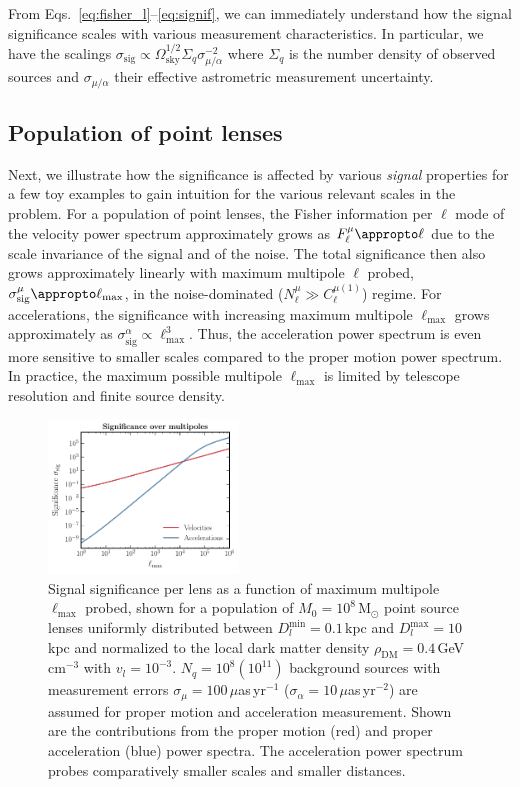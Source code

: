 \documentclass[prd,aps,twocolumn,nofootinbib,superscriptaddress,preprintnumbers,balancelastpage,longbibliography,floatfix]{revtex4-1}
\begin{document}
From Eqs.~\eqref{eq:fisher_l}--\eqref{eq:signif}, we can immediately understand how the signal significance scales with various measurement characteristics. In particular, we have the scalings $\sigma_\mathrm{sig}\propto \Omega_\mathrm{sky}^{1/2}\Sigma_q\sigma_{\mu/\alpha}^{-2}$ where  $\Sigma_q$ is the number density of observed sources and $\sigma_{\mu/\alpha}$ their effective astrometric measurement uncertainty. 

\subsection{Population of point lenses}

Next, we illustrate how the significance is affected by various \emph{signal} properties for a few toy examples to gain intuition for the various relevant scales in the problem.
For a population of point lenses, the Fisher information per $\ell$ mode of the velocity power spectrum approximately grows as $F_\ell^\mu \appropto \ell$ due to the scale invariance of the signal and of the noise. The total significance then also grows approximately linearly with maximum multipole $\ell$ probed, $\sigma_\mathrm{sig}^\mu \appropto \ell_\mathrm{max}$, in the noise-dominated ($N_\ell^\mu\gg C_{\ell}^{\mu (1)}$) regime. 
For accelerations, the significance with increasing maximum multipole $\ell_\mathrm{max}$ grows approximately as $\sigma_\mathrm{sig}^\alpha\propto\ell_\mathrm{max}^3$. Thus, the acceleration power spectrum is even more sensitive to smaller scales compared to the proper motion power spectrum. 
In practice, the maximum possible multipole $\ell_\mathrm{max}$ is limited by telescope resolution and finite source density.

\begin{figure}[htbp]
\centering
\includegraphics[width=0.45\textwidth]{plots/mualpha_compact.pdf}
\caption{Signal significance per lens as a function of maximum multipole $\ell_\mathrm{max}$ probed, shown for a population of $M_0=10^8$\,M$_\odot$ point source lenses uniformly distributed between $D_l^{\mathrm{min}}=0.1$\,kpc and $D_l^{\mathrm{max}}=10$\,kpc and normalized to the local dark matter density $\rho_\mathrm{DM}=0.4$\,GeV\,cm$^{-3}$ with $v_l=10^{-3}$. $N_q=10^8 (10^{11})$ background sources with measurement errors $\sigma_\mu=100\,\mu$as\,yr$^{-1}$ ($\sigma_\alpha=10\,\mu$as\,yr$^{-2}$) are assumed for proper motion and acceleration measurement. Shown are the contributions from the proper motion (red) and proper acceleration (blue) power spectra. The acceleration power spectrum probes comparatively smaller scales and smaller distances. } 
\label{fig:mualpha_compact}
\end{figure}
\end{document}
